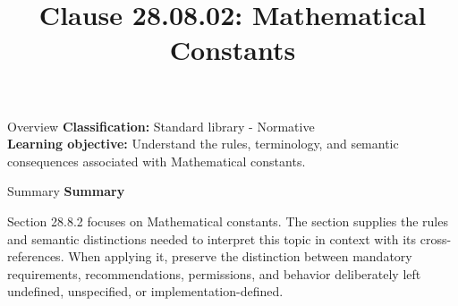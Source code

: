 \documentclass[10pt,letterpaper]{article}
\title{Clause 28.08.02: Mathematical Constants}
\author{}
\date{}
\begin{document}
\maketitle
\begin{CornellOverviewBox}{Overview}
\textbf{Classification:} Standard library - Normative\\[2pt]
\textbf{Learning objective:} Understand the rules, terminology, and semantic consequences associated with Mathematical constants.
\end{CornellOverviewBox}\begin{CornellSummaryBox}{Summary}
{\sffamily\bfseries\color{Accent} Summary}\par\vspace{3pt}Section 28.8.2 focuses on Mathematical constants. The section supplies the rules and semantic distinctions needed to interpret this topic in context with its cross-references. When applying it, preserve the distinction between mandatory requirements, recommendations, permissions, and behavior deliberately left undefined, unspecified, or implementation-defined.
\end{CornellSummaryBox}
\end{document}
